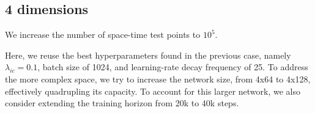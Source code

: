 %
%
%
%
%
%
%
%
%
%
%



\subsection{4 dimensions}


We increase the number of space-time test points to $10^5$.

Here, we reuse the best hyperparameters found in the previous case, namely
$\lambda_{ic}=0.1$, batch size of 1024, and learning-rate decay frequency of 25.
To address the more complex space, we try to increase the network size, from 4x64 to 4x128,
effectively quadrupling its capacity. To account for this larger network,
we also consider extending the training horizon from 20k to 40k steps.

